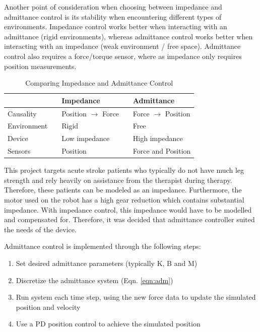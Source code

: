 \documentclass[12pt]{report}
\begin{document}
	Another point of consideration when choosing between impedance and admittance control is its stability when encountering different types of environments. Impedance control works better when interacting with an admittance (rigid environments), whereas admittance control works better when interacting with an impedance (weak environment / free space). Admittance control also requires a force/torque sensor, where as impedance only requires position measurements. 
	
		\begin{table}[h] \label{tab:imp_vs_adm}
	\centering \doublespacing
	\caption{Comparing Impedance and Admittance Control}
	\begin{tabular}{l l l l l}
	\toprule
	& & Impedance & & Admittance \\
	\midrule
	\rowcolor{gray!10} Causality & & Position $\rightarrow$ Force &  & Force $\rightarrow$ Position \\
	Environment & & Rigid & & Free \\
	\rowcolor{gray!10} Device & & Low impedance & & High impedance \\
	Sensors & & Position & & Force and Position \\
	\bottomrule
	\end{tabular}
	\end{table}
	
	This project targets acute stroke patients who typically do not have much leg strength and rely heavily on assistance from the therapist during therapy. Therefore, these patients can be modeled as an impedance. Furthermore, the motor used on the robot has a high gear reduction which contains substantial impedance. With impedance control, this impedance would have to be modelled and compensated for. Therefore, it was decided that admittance controller suited the needs of the device. 
	
Admittance control is implemented through the following steps: 

	\begin{enumerate}
		\item Set desired admittance parameters (typically K, B and M)
		\item Discretize the admittance system (Eqn. \ref{eqn:adm})
		\item Run system each time step, using the new force data to update the simulated position and velocity 
		\item Use a PD position control to achieve the simulated position
	\end{enumerate}
	
\end{document}
